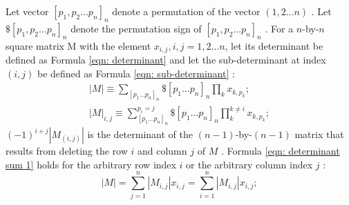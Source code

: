 \documentclass[twoside]{article}
\numberwithin{equation}{section}
\begin{document}
Let vector $[p_{1}, p_{2} \dots p_{n}]_{n}$ denote a permutation of the vector $(1,2\dots n)$ \cite{Linear_Algebra}.  Let $\$[p_{1}, p_{2} \dots p_{n}]_{n}$ denote the permutation sign of $[p_{1}, p_{2} \dots p_{n}]_{n}$ \cite{Linear_Algebra}.  For a $n$-by-$n$ square matrix M with the element $x_{i,j}, i,j=1,2\dots n$, let its determinant be defined as Formula \eqref{eqn: determinant} \cite{Numerical_Recipes} and let the sub-determinant at index $(i, j)$ be defined as Formula \eqref{eqn: sub-determinant} \cite{Linear_Algebra}:
\begin{align}
\label{eqn: determinant}
|M| \equiv 
\sum_{[p_{1}\dots p_{n}]_{n}} \$ [p_{1}\dots p_{n}]_{n} 
    \prod _{k} x_{k,p_{k}}; \\
\label{eqn: sub-determinant}
|M|_{i,j} \equiv 
\sum_{[p_{1}\dots p_{n}]_{n}}^{p_{i} = j} \$ [p_{1}\dots p_{n}]_{n} 
    \prod _{k}^{k \ne i} x_{k,p_{k}};
\end{align}
$(-1)^{i+j} |M_{(i,j)}|$ is the determinant of the $(n-1)$-by-$(n-1)$ matrix that results from deleting the row $i$ and column $j$ of $M$ \cite{Numerical_Recipes}.  Formula \eqref{eqn: determinant sum 1} holds for the arbitrary row index $i$ or the arbitrary column index $j$ \cite{Numerical_Recipes}:
\begin{equation}
\label{eqn: determinant sum 1}
|M| =\sum_{j=1}^{n} |M_{i,j}| x_{i,j} = \sum_{i=1}^{n} |M_{i,j}| x_{i,j};
\end{equation}
\end{document}
